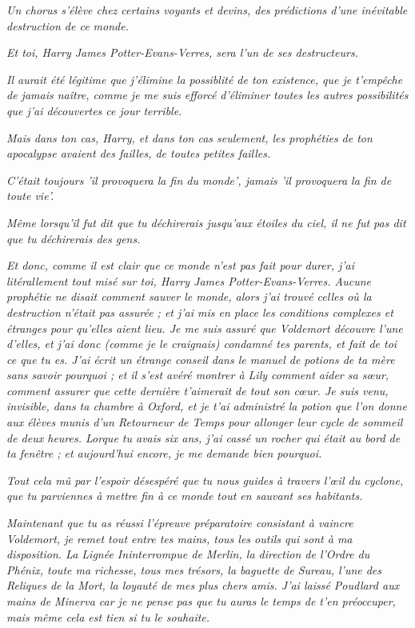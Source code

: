 \emph{Un chorus s'élève chez certains voyants et devins, des prédictions d'une inévitable destruction de ce monde.} 

\emph{Et toi, Harry James Potter-Evans-Verres, sera l'un de ses destructeurs.} 

\emph{Il aurait été légitime que j'élimine la possiblité de ton existence, que je t'empêche de jamais naître, comme je me suis efforcé d'éliminer toutes les autres possibilités que j'ai découvertes ce jour terrible.} 

\emph{Mais dans ton cas, Harry, et dans ton cas seulement, les prophéties de ton apocalypse avaient des failles, de toutes petites failles.} 

\emph{C'était toujours 'il provoquera la fin du monde', jamais 'il provoquera la fin de toute vie'.} 

\emph{Même lorsqu'il fut dit que tu déchirerais jusqu'aux étoiles du ciel, il ne fut pas dit que tu déchirerais des gens.} 

\emph{Et donc, comme il est clair que ce monde n'est pas fait pour durer, j'ai litérallement tout misé sur toi, Harry James Potter-Evans-Verres. Aucune prophétie ne disait comment sauver le monde, alors j'ai trouvé celles où la destruction n'était pas assurée ; et j'ai mis en place les conditions complexes et étranges pour qu'elles aient lieu. Je me suis assuré que Voldemort découvre l'une d'elles, et j'ai donc (comme je le craignais) condamné tes parents, et fait de toi ce que tu es. J'ai écrit un étrange conseil dans le manuel de potions de ta mère sans savoir pourquoi ; et il s'est avéré montrer à Lily comment aider sa sœur, comment assurer que cette dernière t'aimerait de tout son cœur. Je suis venu, invisible, dans ta chambre à Oxford, et je t'ai administré la potion que l'on donne aux élèves munis d'un Retourneur de Temps pour allonger leur cycle de sommeil de deux heures. Lorque tu avais six ans, j'ai cassé un rocher qui était au bord de ta fenêtre ; et aujourd'hui encore, je me demande bien pourquoi.} 

\emph{Tout cela mû par l'espoir désespéré que tu nous guides à travers l'œil du cyclone, que tu parviennes à mettre fin à ce monde tout en sauvant ses habitants.} 

\emph{Maintenant que tu as réussi l'épreuve préparatoire consistant à vaincre Voldemort, je remet tout entre tes mains, tous les outils qui sont à ma disposition. La Lignée Ininterrompue de Merlin, la direction de l'Ordre du Phénix, toute ma richesse, tous mes trésors, la baguette de Sureau, l'une des Reliques de la Mort, la loyauté de mes plus chers amis. J'ai laissé Poudlard aux mains de Minerva car je ne pense pas que tu auras le temps de t'en préoccuper, mais même cela est tien si tu le souhaite.} 

